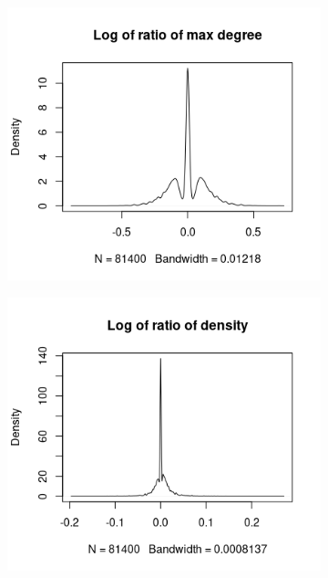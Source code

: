 \documentclass{l4proj}
\theoremstyle{definition}
\theoremstyle{remark}
\begin{document}
\begin{figure}
  \begin{subfigure}[t]{0.49\textwidth}
    \centering
    \includegraphics[width=\textwidth]{images/mcs_ratio_maxdeg.png}
  \end{subfigure}
  \begin{subfigure}[t]{0.49\textwidth}
    \centering
    \includegraphics[width=\textwidth]{images/mcs_ratio_density.png}
  \end{subfigure}
  \begin{subfigure}[t]{0.49\textwidth}

\end{subfigure}
\end{figure}
\end{document}
